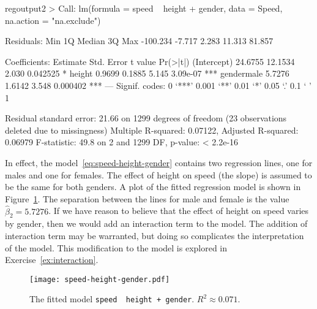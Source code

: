 \begin{SaveVerbatim}{regoutput2}
>
Call:
lm(formula = speed ~ height + gender, data = Speed, na.action = "na.exclude")

Residuals:
     Min       1Q   Median       3Q      Max 
-100.234   -7.717    2.283   11.313   81.857 

Coefficients:
            Estimate Std. Error t value Pr(>|t|)    
(Intercept)  24.6755    12.1534   2.030 0.042525 *  
height        0.9699     0.1885   5.145 3.09e-07 ***
gendermale    5.7276     1.6142   3.548 0.000402 ***
---
Signif. codes:  0 ‘***’ 0.001 ‘**’ 0.01 ‘*’ 0.05 ‘.’ 0.1 ‘ ’ 1

Residual standard error: 21.66 on 1299 degrees of freedom
  (23 observations deleted due to missingness)
Multiple R-squared:  0.07122,	Adjusted R-squared:  0.06979 
F-statistic:  49.8 on 2 and 1299 DF,  p-value: < 2.2e-16
\end{SaveVerbatim}

\begin{figure}
\end{figure}

In effect, the model~\ref{eq:speed-height-gender} contains two
regression lines, one for males and one for females. The effect of
height on speed (the slope) is assumed to be the same for both
genders.  A plot of the fitted regression model is shown in
Figure~\ref{fig:speed-height-gender}. The separation between the lines
for male and female is the value $\hat{\beta}_2 = 5.7276$. If we have
reason to believe that the effect of height on speed varies by gender,
then we would add an interaction term to the model. The addition of
interaction term may be warranted, but doing so complicates the
interpretation of the model. This modification to the model is
explored in Exercise~\ref{ex:interaction}.

\begin{figure}
\begin{center}
\texttt{[image: speed-height-gender.pdf]}
\caption{The fitted model \texttt{speed~\mtilde~height + gender}. $R^2 \approx 0.071$.}
\label{fig:speed-height-gender}
\end{center}
\end{figure}

